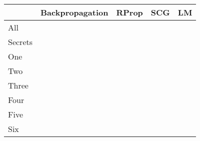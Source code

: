 \begin{tabular}{ l | l | l | l | l }
 & Backpropagation & RProp & SCG & LM \\
\hline
All &  & 
 &   
&  \\
\hline
Secrets & 
&  &  &  \\
\hline
One & 
&  & 
  
&   \\
\hline
Two & 
&  & 
  
&   \\
\hline
Three & 
&  & 
  &
  \\
\hline
Four & 
&  &
   &
    \\
\hline
Five & 
&  &
   &
   \\
\hline
Six & 
&  &
   &
    \\
\hline
\end{tabular}
